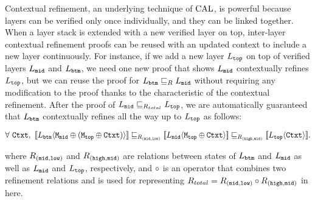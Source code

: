 Contextual refinement, an underlying technique of $\mathrm{CAL}$, is powerful because layers can be verified only once individually, and they can be linked together.
 When a layer stack is extended with a new verified layer on top, 
  inter-layer contextual refinement proofs can be reused with an updated context to include a new layer continuously. 
For instance, if we add a new layer $L_{{\mathrm{\texttt{top}}}}$ on top of verified layers $L_{{\mathrm{\texttt{mid}}}}$ and $L_{{\mathrm{\texttt{btm}}}}$, 
we need one new proof that shows $L_{{\mathrm{\texttt{mid}}}}$ contextually refines $L_{{\mathrm{\texttt{top}}}}$, but we can reuse the proof for $L_{{\mathrm{\texttt{btm}}}} \sqsubseteq_{R} L_{{\mathrm{\texttt{mid}}}}$ without requiring any modification to the proof thanks to the characteristic of the contextual refinement. After the proof of $L_{{\mathrm{\texttt{mid}}}} \sqsubseteq_{{R}_{total}} L_{{\mathrm{\texttt{top}}}}$, we are automatically guaranteed that $L_{{\mathrm{\texttt{btm}}}}$ contextually refines all the way up to $L_{{\mathrm{\texttt{top}}}}$ as follows:
\begin{center}
$
\forall\ \codeinmath{Ctxt},\ \sem{L_{\codeinmath{btm}}}{\modulecompose{\codeinmath{M}_{\codeinmath{mid}}}{(\modulecompose{\codeinmath{M}_{\codeinmath{top}}}{\codeinmath{Ctxt})}}} \refines_{R_{(\codeinmath{mid}, \codeinmath{low})}}  \sem{L_{\codeinmath{mid}}}{\modulecompose{\codeinmath{M}_{\codeinmath{top}}}{\codeinmath{Ctxt}}} \refines_{R_{(\codeinmath{high}, \codeinmath{mid})}} \sem{L_{\codeinmath{top}}}{\codeinmath{Ctxt}}. 
$
\end{center}
where $R_{({\mathrm{\texttt{mid}}}, {\mathrm{\texttt{low}}})}$ and $R_{({\mathrm{\texttt{high}}}, {\mathrm{\texttt{mid}}})}$ are relations between states of $ L_{{\mathrm{\texttt{btm}}}}$ and $L_{{\mathrm{\texttt{mid}}}}$ as well as
 $ L_{{\mathrm{\texttt{mid}}}}$ and $L_{{\mathrm{\texttt{top}}}}$, respectively, 
and $\circ$ is an operator that combines two refinement relations and is used for representing  
 ${R}_{total} ={R_{({\mathrm{\texttt{mid}}}, {\mathrm{\texttt{low}}})}} \circ {{R_{({\mathrm{\texttt{high}}}, {\mathrm{\texttt{mid}}})}}}$ in here.



